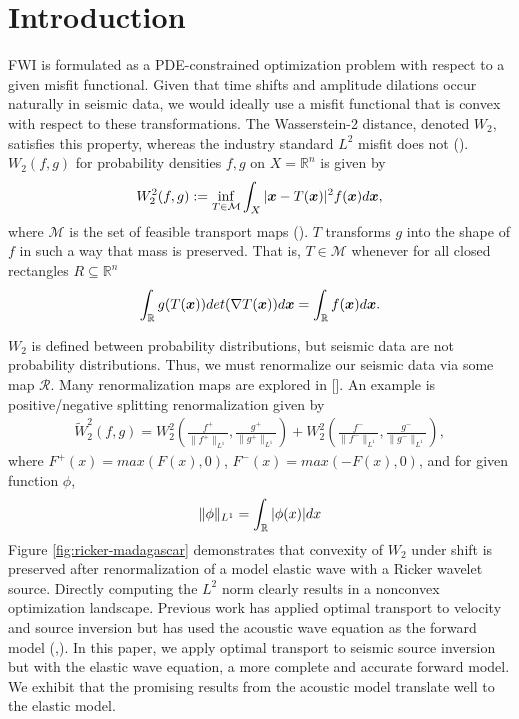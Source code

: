 \section{Introduction}
FWI is formulated as a PDE-constrained optimization problem with respect to a given misfit functional. Given that time shifts and amplitude dilations occur naturally in seismic data, we would ideally use a misfit functional that is convex with respect to these transformations. The Wasserstein-2 distance, denoted $W_2$, satisfies this property, whereas the industry standard $L^2$ misfit does not (). 
$W_2(f,g)$ for probability densities $f,g$ on $X=\mathbb{R}^{n}$ is given by
\begin{align} \label{eqn:w2}
    W_2^2(f,g) := \inf_{T \in \mathcal{M}} \int_{X} |\boldsymbol{x} - T(\boldsymbol{x})|^2 f(\boldsymbol{x}) d\boldsymbol{x},
\end{align}
where $\mathcal{M}$ is the set of feasible transport maps (). $T$ transforms $g$ into the shape of $f$ in such a way that mass is preserved. That is, $T \in \mathcal{M}$ whenever for all closed rectangles $R \subseteq \mathbb{R}^{n}$
\begin{align*}
    \int_{\mathbb{R}} g(T(\boldsymbol{x})) det(\nabla T(\boldsymbol{x})) d\boldsymbol{x} = \int_{\mathbb{R}} f(\boldsymbol{x}) d\boldsymbol{x}.
\end{align*}

$W_2$ is defined between probability distributions, but seismic data are not probability distributions. 
Thus, we must renormalize our seismic data via some map $\mathcal{R}$. Many renormalization maps are explored in []. An example is positive/negative splitting renormalization given by
\begin{align}\label{eqn:w2tilde}
    \tilde{W}_{2}^{2}(f,g) = W_{2}^{2}\left( \frac{f^{+}}{\|f^{+}\|_{L^1}}, \frac{g^{+}}{\|g^{+}\|_{L^1}}\right) + W_{2}^{2}\left(\frac{f^{-}}{\|f^{-}\|_{L^1}}, \frac{g^{-}}{\|g^{-}\|_{L^1}}\right),
\end{align}
where $F^{+}(x) = max(F(x), 0)$, $F^{-}(x) = max(-F(x), 0)$, and for given function $\phi$,
\begin{align*}
    \|\phi\|_{L^1} = \int_{\mathbb{R}} |\phi(x)| dx
\end{align*}
Figure \ref{fig:ricker-madagascar} demonstrates that convexity of $W_2$ under shift is preserved after renormalization of a model elastic wave with a Ricker wavelet source. Directly computing the $L^2$ norm clearly results in a nonconvex optimization landscape. Previous work has applied optimal transport to velocity and source inversion but has used the acoustic wave equation as the forward model (,\cite{yang2018application}). In this paper, we apply optimal transport to seismic source inversion but with the elastic wave equation, a more complete and accurate forward model. We exhibit that the promising results from the acoustic model translate well to the elastic model. 

